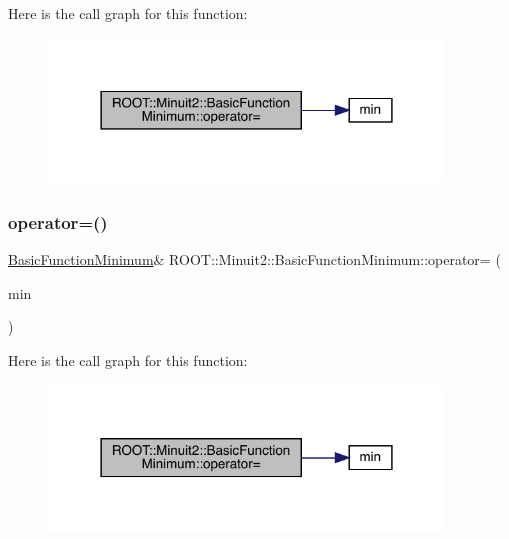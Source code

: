 Here is the call graph for this function\+:
\nopagebreak
\begin{figure}[H]
\begin{center}
\leavevmode
\includegraphics[width=298pt]{de/d25/classROOT_1_1Minuit2_1_1BasicFunctionMinimum_ad143c1c314e041649151bac9bb9e7a91_cgraph}
\end{center}
\end{figure}
\mbox{\label{classROOT_1_1Minuit2_1_1BasicFunctionMinimum_ad143c1c314e041649151bac9bb9e7a91}} 
\subsubsection{\texorpdfstring{operator=()}{operator=()}\hspace{0.1cm}{\footnotesize\ttfamily [2/3]}}
{\footnotesize\ttfamily \mbox{\hyperlink{classROOT_1_1Minuit2_1_1BasicFunctionMinimum}{Basic\+Function\+Minimum}}\& R\+O\+O\+T\+::\+Minuit2\+::\+Basic\+Function\+Minimum\+::operator= (\begin{DoxyParamCaption}\item[{const \mbox{\hyperlink{classROOT_1_1Minuit2_1_1BasicFunctionMinimum}{Basic\+Function\+Minimum}} \&}]{min }\end{DoxyParamCaption})\hspace{0.3cm}{\ttfamily [inline]}}

Here is the call graph for this function\+:
\nopagebreak
\begin{figure}[H]
\begin{center}
\leavevmode
\includegraphics[width=298pt]{de/d25/classROOT_1_1Minuit2_1_1BasicFunctionMinimum_ad143c1c314e041649151bac9bb9e7a91_cgraph}
\end{center}
\end{figure}
\mbox{\label{classROOT_1_1Minuit2_1_1BasicFunctionMinimum_ad143c1c314e041649151bac9bb9e7a91}} 
